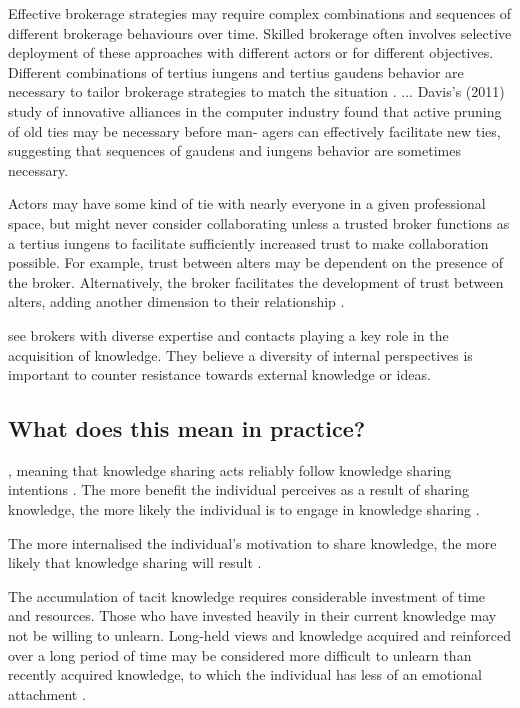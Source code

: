 Effective brokerage strategies may require complex combinations and sequences of different brokerage behaviours over time. Skilled brokerage often involves selective deployment of these approaches with different actors or for different objectives. Different combinations of tertius iungens and tertius gaudens behavior are necessary to tailor brokerage strategies to match the situation \citep{obstfeld2014brokerage}. ... Davis’s (2011) study of innovative alliances in the computer industry found that active pruning of old ties may be necessary before man- agers can effectively facilitate new ties, suggesting that sequences of gaudens and iungens behavior are sometimes necessary.

Actors may have some kind of tie with nearly everyone in a given professional space, but might never consider collaborating unless a trusted broker functions as a tertius iungens to facilitate sufficiently increased trust to make collaboration possible. For example, trust between alters may be dependent on the presence of the broker. Alternatively, the broker facilitates the development of trust between alters, adding another dimension to their relationship \citep{obstfeld2014brokerage}.

\citet{cohen1990absorptive} see brokers with diverse expertise and contacts playing a key role in the acquisition of knowledge. They believe a diversity of internal perspectives is important to counter resistance towards external knowledge or ideas.  

\subsection{What does this mean in practice?}

, meaning that knowledge sharing acts reliably follow knowledge sharing intentions \citep{witherspoon2013antecedents}. The more benefit the individual perceives as a result of sharing knowledge, the more likely the individual is to engage in knowledge sharing \citep{bock2001breaking,witherspoon2013antecedents}.

The more internalised the individual’s motivation to share knowledge, the more likely that knowledge sharing will result \citep{gagne2009model,witherspoon2013antecedents}.

The accumulation of tacit knowledge requires considerable investment of time and resources. Those who have invested heavily in their current knowledge may not be willing to unlearn. Long-held views and knowledge acquired and reinforced over a long period of time may be considered more difficult to unlearn than recently acquired knowledge, to which the individual has less of an emotional attachment \citep{rebernik2007fostering}.

